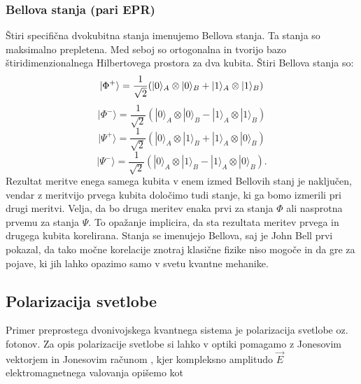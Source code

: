 \documentclass[12pt]{article}
\begin{document}
\subsubsection{Bellova stanja (pari EPR)}
Štiri specifična dvokubitna stanja imenujemo Bellova stanja. Ta stanja so maksimalno prepletena. Med seboj so ortogonalna in tvorijo bazo štiridimenzionalnega Hilbertovega prostora za dva kubita. Štiri Bellova stanja so:
\begin{equation}
|\Phi ^{+}\rangle ={\frac  {1}{{\sqrt  {2}}}}(|0\rangle _{A}\otimes |0\rangle _{B}+|1\rangle _{A}\otimes |1\rangle _{B}) \\
\end{equation}
\begin{equation}
|\Phi ^{-}\rangle ={\frac  {1}{{\sqrt  {2}}}}(|0\rangle _{A}\otimes |0\rangle _{B}-|1\rangle _{A}\otimes |1\rangle _{B})
\end{equation}
\begin{equation}
|\Psi ^{+}\rangle ={\frac  {1}{{\sqrt  {2}}}}(|0\rangle _{A}\otimes |1\rangle _{B}+|1\rangle _{A}\otimes |0\rangle _{B})
\end{equation}
\begin{equation}
{\displaystyle |\Psi ^{-}\rangle ={\frac {1}{\sqrt {2}}}(|0\rangle _{A}\otimes |1\rangle _{B}-|1\rangle _{A}\otimes |0\rangle _{B})}.
\end{equation}
Rezultat meritve enega samega kubita v enem izmed Bellovih stanj je naključen, vendar z meritvijo prvega kubita določimo tudi stanje, ki ga bomo izmerili pri drugi meritvi. Velja, da bo druga meritev enaka prvi za stanja $\Phi$ ali nasprotna prvemu za stanja $\Psi$. To opažanje implicira, da sta rezultata meritev prvega in drugega kubita korelirana. Stanja se imenujejo Bellova, saj je John Bell prvi pokazal, da tako močne korelacije znotraj klasične fizike niso mogoče in da gre za pojave, ki jih lahko opazimo samo v svetu kvantne mehanike. \cite{BellState2023}

\subsection{Polarizacija svetlobe}

Primer preprostega dvonivojskega kvantnega sistema je polarizacija svetlobe oz. fotonov. Za opis polarizacije svetlobe si lahko v optiki pomagamo z Jonesovim vektorjem in Jonesovim računom \cite{JonesCalculus2023}, kjer kompleksno amplitudo $\vec{E}$ elektromagnetnega valovanja opišemo kot
\end{document}
